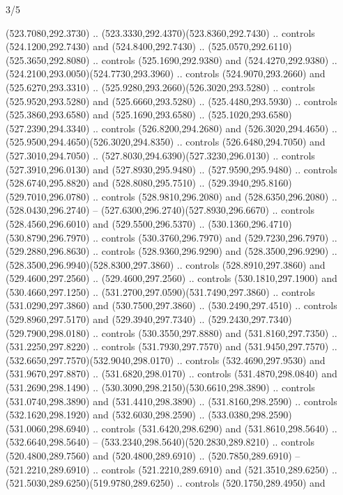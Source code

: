 \begin{flagdescription}{3/5}
\begin{scope}[shift={(0.5\flaglength,0.5\flagwidth)},scale=\flagwidth/1075]
\begin{scope}[y=0.80pt, x=0.80pt, yscale=-2.37, xscale=2.37,xshift=-402,yshift=-230.4]
  (523.7080,292.3730) .. (523.3330,292.4370)(523.8360,292.7430) .. controls
  (524.1200,292.7430) and (524.8400,292.7430) ..
  (525.0570,292.6110)(525.3650,292.8080) .. controls (525.1690,292.9380) and
  (524.4270,292.9380) .. (524.2100,293.0050)(524.7730,293.3960) .. controls
  (524.9070,293.2660) and (525.6270,293.3310) ..
  (525.9280,293.2660)(526.3020,293.5280) .. controls (525.9520,293.5280) and
  (525.6660,293.5280) .. (525.4480,293.5930) .. controls (525.3860,293.6580) and
  (525.1690,293.6580) .. (525.1020,293.6580)(527.2390,294.3340) .. controls
  (526.8200,294.2680) and (526.3020,294.4650) ..
  (525.9500,294.4650)(526.3020,294.8350) .. controls (526.6480,294.7050) and
  (527.3010,294.7050) .. (527.8030,294.6390)(527.3230,296.0130) .. controls
  (527.3910,296.0130) and (527.8930,295.9480) .. (527.9590,295.9480) .. controls
  (528.6740,295.8820) and (528.8080,295.7510) ..
  (529.3940,295.8160)(529.7010,296.0780) .. controls (528.9810,296.2080) and
  (528.6350,296.2080) .. (528.0430,296.2740) --
  (527.6300,296.2740)(527.8930,296.6670) .. controls (528.4560,296.6010) and
  (529.5500,296.5370) .. (530.1360,296.4710)(530.8790,296.7970) .. controls
  (530.3760,296.7970) and (529.7230,296.7970) .. (529.2880,296.8630) .. controls
  (528.9360,296.9290) and (528.3500,296.9290) ..
  (528.3500,296.9940)(528.8300,297.3860) .. controls (528.8910,297.3860) and
  (529.4600,297.2560) .. (529.4600,297.2560) .. controls (530.1810,297.1900) and
  (530.4660,297.1250) .. (531.2700,297.0590)(531.7490,297.3860) .. controls
  (531.0290,297.3860) and (530.7500,297.3860) .. (530.2490,297.4510) .. controls
  (529.8960,297.5170) and (529.3940,297.7340) ..
  (529.2430,297.7340)(529.7900,298.0180) .. controls (530.3550,297.8880) and
  (531.8160,297.7350) .. (531.2250,297.8220) .. controls (531.7930,297.7570) and
  (531.9450,297.7570) .. (532.6650,297.7570)(532.9040,298.0170) .. controls
  (532.4690,297.9530) and (531.9670,297.8870) .. (531.6820,298.0170) .. controls
  (531.4870,298.0840) and (531.2690,298.1490) ..
  (530.3090,298.2150)(530.6610,298.3890) .. controls (531.0740,298.3890) and
  (531.4410,298.3890) .. (531.8160,298.2590) .. controls (532.1620,298.1920) and
  (532.6030,298.2590) .. (533.0380,298.2590)(531.0060,298.6940) .. controls
  (531.6420,298.6290) and (531.8610,298.5640) .. (532.6640,298.5640) --
  (533.2340,298.5640)(520.2830,289.8210) .. controls (520.4800,289.7560) and
  (520.4800,289.6910) .. (520.7850,289.6910) -- (521.2210,289.6910) .. controls
  (521.2210,289.6910) and (521.3510,289.6250) ..
  (521.5030,289.6250)(519.9780,289.6250) .. controls (520.1750,289.4950) and

\end{scope}
\end{scope}
\end{flagdescription}
